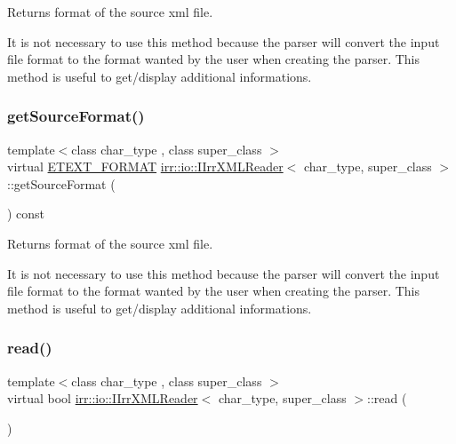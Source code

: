 Returns format of the source xml file. 

It is not necessary to use this method because the parser will convert the input file format to the format wanted by the user when creating the parser. This method is useful to get/display additional informations. \mbox{\label{classirr_1_1io_1_1IIrrXMLReader_a00998ef2d3a562d6b2b8302c3430322d}} 
\subsubsection{\texorpdfstring{get\+Source\+Format()}{getSourceFormat()}\hspace{0.1cm}{\footnotesize\ttfamily [2/2]}}
{\footnotesize\ttfamily template$<$class char\+\_\+type , class super\+\_\+class $>$ \\
virtual \hyperlink{namespaceirr_1_1io_ac7e51e5a6bd00451dec248f497b16a9d}{E\+T\+E\+X\+T\+\_\+\+F\+O\+R\+M\+AT} \hyperlink{classirr_1_1io_1_1IIrrXMLReader}{irr\+::io\+::\+I\+Irr\+X\+M\+L\+Reader}$<$ char\+\_\+type, super\+\_\+class $>$\+::get\+Source\+Format (\begin{DoxyParamCaption}{ }\end{DoxyParamCaption}) const\hspace{0.3cm}{\ttfamily [pure virtual]}}



Returns format of the source xml file. 

It is not necessary to use this method because the parser will convert the input file format to the format wanted by the user when creating the parser. This method is useful to get/display additional informations. \mbox{\label{classirr_1_1io_1_1IIrrXMLReader_a157f458f7dabeeff173f72a0fb443a8e}} 
\subsubsection{\texorpdfstring{read()}{read()}\hspace{0.1cm}{\footnotesize\ttfamily [1/2]}}
{\footnotesize\ttfamily template$<$class char\+\_\+type , class super\+\_\+class $>$ \\
virtual bool \hyperlink{classirr_1_1io_1_1IIrrXMLReader}{irr\+::io\+::\+I\+Irr\+X\+M\+L\+Reader}$<$ char\+\_\+type, super\+\_\+class $>$\+::read (\begin{DoxyParamCaption}{ }\end{DoxyParamCaption})\hspace{0.3cm}{\ttfamily [pure virtual]}}



